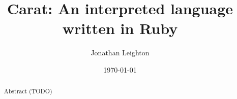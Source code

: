 \documentclass[10pt,a4paper]{article}
\title{Carat: An interpreted language written in Ruby}
\author{Jonathan Leighton}
\date{\today}
\numberwithin{figure}{section}
\begin{document}
	\maketitle
	
	\begin{abstract}
	Abstract (TODO)
	\end{abstract}
	
	\tableofcontents
	
	\setlength{\parindent}{0pt}
  \setlength{\parskip}{2ex}
	
	
	
	
	
	\printglossary
\end{document}
